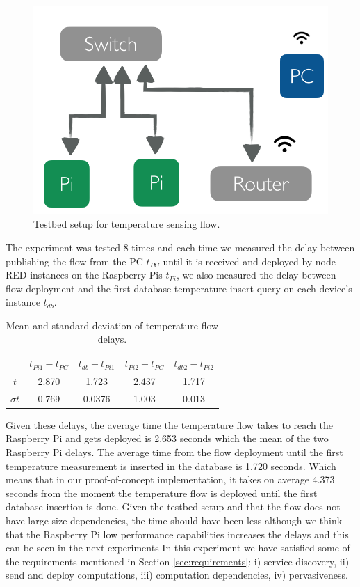  \begin{figure}[H]
	\centering
	\includegraphics[scale=0.6]{images/tb-temp.png}
	\caption{Testbed setup for temperature sensing flow.}
	\label{fig:tb-temp}
\end{figure} 

\noindent The experiment was tested 8 times and each time  we measured the delay between publishing the flow from the PC $ t_{PC}$ until it is received and deployed by  node-RED instances on the Raspberry Pis $t_{Pi}$, we also measured the delay between flow deployment and the first database temperature insert query on each device's instance $t_{db}$. 
\begin{table}[H]
	\centering
	\begin{tabular}{c|c|c|c|c}\toprule
		&  $ t_{Pi1} - t_{PC}$   & $t_{db} - t_{Pi1}$  & $ t_{Pi2} - t_{PC}$ &  $t_{db2} - t_{Pi2}$ \\ \midrule
$ \overline{t} $ &2.870&	1.723&	2.437&	1.717\\
$ \sigma t $& 0.769	&0.0376&	1.003&	0.013\\
	\end{tabular}
	\caption{Mean and standard deviation of temperature flow delays.}
	\label{table:temp}
\end{table}

\noindent Given these delays, the average time the temperature flow takes to reach the Raspberry Pi and gets deployed is 2.653 seconds which the mean of the two Raspberry Pi delays. The average time from the flow deployment  until the first temperature measurement is inserted in the database    is 1.720 seconds. Which means that in our proof-of-concept implementation, it takes on average 4.373 seconds from the moment 
the temperature flow is deployed until the first database  insertion is done. Given the testbed setup and that the flow does not have large size dependencies, the time should have been less although we think that the Raspberry Pi  low performance capabilities increases the delays and this can be seen in the next experiments  In this experiment we have satisfied some of the requirements mentioned in  Section \ref{sec:requirements}: i) service discovery, ii) send and deploy computations, iii) computation dependencies, iv) pervasiveness.

